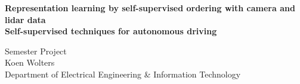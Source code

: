 %

\begin{titlepage}

\thispagestyle{empty}




\vspace*{2cm}
\begin{center}
\Huge{\textbf{Representation learning by self-supervised ordering with camera and lidar data}\\}
\vspace*{3mm}
\Large{\textbf{Self-supervised techniques for autonomous driving}\\[1cm]}

\large{Semester Project\\[0.8cm]}
\LARGE{Koen Wolters\\}
\normalsize{Department of Electrical Engineering \& Information Technology}
\end{center}

\begin{center}
 




\end{center}
\end{titlepage}
